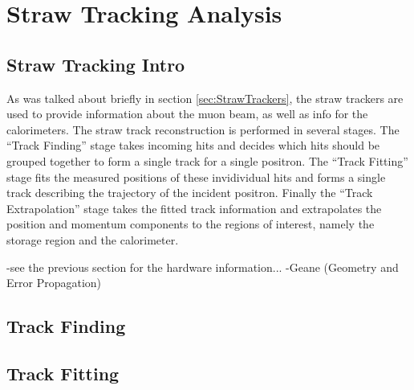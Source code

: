 \thispagestyle{myheadings} %

\graphicspath{ {Body/Figures/TrackingFigures/} {Body/Figures/TrackingFigures/MainPlots/} {Body/Figures/TrackingFigures/MainPlots/PlanePlots/} {Body/Figures/TrackingFigures/MainPlots/PullPlots/} {Body/Figures/TrackingFigures/MainPlots/Residuals/} {Body/Figures/TrackingFigures/eLoss/} {Body/Figures/TrackingFigures/CoordSys/} {Body/Figures/TrackingFigures/TrackerPics/} {Body/Figures/TrackingFigures/Field/} {Body/Figures/TrackingFigures/TrackingFlow/} {Body/Figures/TrackingFigures/LeftRight/} {Body/Figures/TrackingFigures/Misc/}}


\chapter{Straw Tracking Analysis}
\label{chapter:Straw Tracking Analysis}

\section{Straw Tracking Intro}
\label{sec:StrawTrackingIntro}

As was talked about briefly in section \ref{sec:StrawTrackers}, the straw trackers are used to provide information about the muon beam, as well as info for the calorimeters. The straw track reconstruction is performed in several stages. The ``Track Finding'' stage takes incoming hits and decides which hits should be grouped together to form a single track for a single positron. The ``Track Fitting'' stage fits the measured positions of these invidividual hits and forms a single track describing the trajectory of the incident positron. Finally the ``Track Extrapolation'' stage takes the fitted track information and extrapolates the position and momentum components to the regions of interest, namely the storage region and the calorimeter.







-see the previous section for the hardware information...
-Geane (Geometry and Error Propagation)




\section{Track Finding}
\label{sec:Track Finding}

\section{Track Fitting}
\label{sec:Track Fitting}

